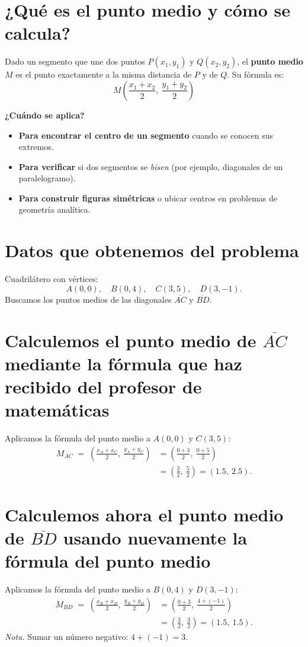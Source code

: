\documentclass[12pt,a4paper]{article}
\begin{document}
{		
		\section{¿Qué es el punto medio y cómo se calcula?}
		Dado un segmento que une dos puntos \(P(x_1,y_1)\) y \(Q(x_2,y_2)\), el
		\textbf{punto medio} \(M\) es el punto exactamente a la misma distancia de \(P\) y de \(Q\).
		Su fórmula es:
		\[
		\boxed{\,M\left(\dfrac{x_1+x_2}{2},\ \dfrac{y_1+y_2}{2}\right)\,}
		\]
		
		\textbf{¿Cuándo se aplica?}
		\begin{itemize}
			\item \textbf{Para encontrar el centro de un segmento} cuando se conocen sus extremos.
			\item \textbf{Para verificar} si dos segmentos se \emph{bisen} (por ejemplo, diagonales de un paralelogramo).
			\item \textbf{Para construir figuras simétricas} o ubicar centros en problemas de geometría analítica.
		\end{itemize}
		
		\section*{Datos que obtenemos del problema}
		Cuadrilátero con vértices:
		\[
		A(0,0),\quad B(0,4),\quad C(3,5),\quad D(3,-1).
		\]
		Buscamos los puntos medios de las diagonales \(\overline{AC}\) y \(\overline{BD}\).
		
		\section*{Calculemos el punto medio de \(\overline{AC}\) mediante la fórmula que haz recibido del profesor de matemáticas}
		Aplicamos la fórmula del punto medio a \(A(0,0)\) y \(C(3,5)\):
		\[
		\begin{aligned}
			M_{AC} \;=\;
			\left(\frac{x_A+x_C}{2},\ \frac{y_A+y_C}{2}\right)
			&=\left(\frac{0+3}{2},\ \frac{0+5}{2}\right) \\
			&=\left(\frac{3}{2},\ \frac{5}{2}\right)
			=(1.5,\ 2.5).
		\end{aligned}
		\]
		
		\section*{Calculemos ahora el punto medio de \(\overline{BD}\) usando nuevamente la fórmula del punto medio}
		Aplicamos la fórmula del punto medio a \(B(0,4)\) y \(D(3,-1)\):
		\[
		\begin{aligned}
			M_{BD} \;=\;
			\left(\frac{x_B+x_D}{2},\ \frac{y_B+y_D}{2}\right)
			&=\left(\frac{0+3}{2},\ \frac{4+(-1)}{2}\right) \\
			&=\left(\frac{3}{2},\ \frac{3}{2}\right)
			=(1.5,\ 1.5).
		\end{aligned}
		\]
		\emph{Nota.} Sumar un número negativo: \(4+(-1)=3\).
		
}
\end{document}
